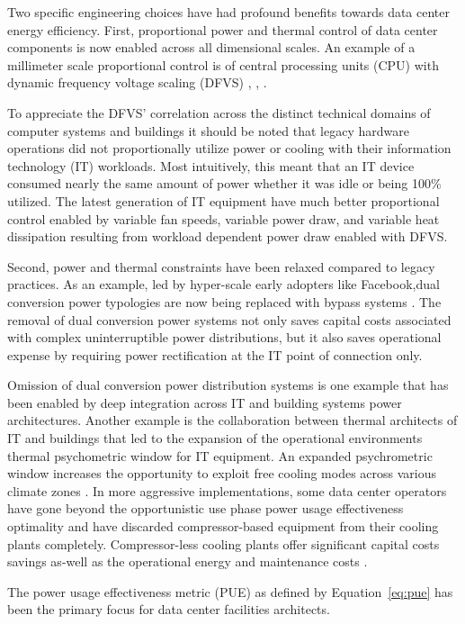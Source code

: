 \documentclass[twocolumn, a4paper,10pt]{article}
\begin{document}
Two specific engineering choices have had profound benefits towards data center energy efficiency. First, proportional power and thermal control of data center components is now enabled across all dimensional scales. An example of a millimeter scale proportional control is of central processing units (CPU) with dynamic frequency voltage scaling (DFVS) \citep{osullivan15}, \citep{barroso18}, \citep{joshi12}.

To appreciate the DFVS’ correlation across the distinct technical domains of computer systems and buildings it should be noted that legacy hardware operations did not proportionally utilize power or cooling with their information technology  (IT) workloads. Most intuitively, this meant that an IT device consumed nearly the same amount of power whether it was idle or being 100\% utilized. The latest generation of IT equipment have much better proportional control enabled by variable fan speeds, variable power draw, and variable heat dissipation resulting from workload dependent power draw enabled with DFVS.  

Second, power and thermal constraints have been relaxed compared to legacy practices. As an example, led by hyper-scale early adopters like Facebook,dual conversion power typologies are now being replaced with bypass systems \citep{Park15}. The removal of dual conversion power systems not only saves capital costs associated with complex uninterruptible power distributions, but it also saves operational expense by requiring power rectification at the IT point of connection only. 

Omission of dual conversion power distribution systems is one example that has been enabled by deep integration across IT and building systems power architectures. Another example is the collaboration between thermal architects of IT and buildings that led to the expansion of the operational environment\textsc{}s thermal psychometric window for IT equipment. An expanded psychrometric window increases the opportunity to exploit free cooling modes across various climate zones \citep{ASHRAETC9.9}. In more aggressive implementations, some data center operators have gone beyond the opportunistic use phase power usage effectiveness optimality and have discarded compressor-based equipment from their cooling plants completely. Compressor-less cooling plants offer significant capital costs savings as-well as the operational energy and maintenance costs \citep{Mulay18}. 

The power usage effectiveness metric (PUE) as defined by Equation~\ref{eq:pue} has been the primary focus for data center facilities architects. 
\end{document}
